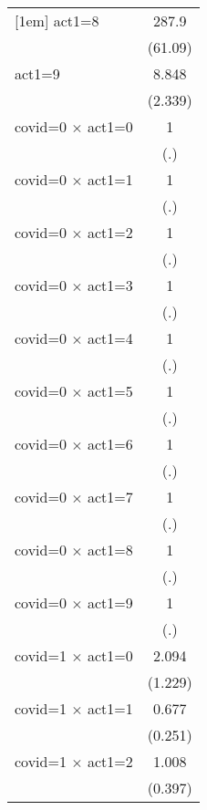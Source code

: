 {\begin{tabular}{l*{1}{c}}
[1em]
act1=8              &       287.9\sym{***}\\
                    &     (61.09)         \\
[1em]
act1=9              &       8.848\sym{***}\\
                    &     (2.339)         \\
[1em]
covid=0 $\times$ act1=0&           1         \\
                    &         (.)         \\
[1em]
covid=0 $\times$ act1=1&           1         \\
                    &         (.)         \\
[1em]
covid=0 $\times$ act1=2&           1         \\
                    &         (.)         \\
[1em]
covid=0 $\times$ act1=3&           1         \\
                    &         (.)         \\
[1em]
covid=0 $\times$ act1=4&           1         \\
                    &         (.)         \\
[1em]
covid=0 $\times$ act1=5&           1         \\
                    &         (.)         \\
[1em]
covid=0 $\times$ act1=6&           1         \\
                    &         (.)         \\
[1em]
covid=0 $\times$ act1=7&           1         \\
                    &         (.)         \\
[1em]
covid=0 $\times$ act1=8&           1         \\
                    &         (.)         \\
[1em]
covid=0 $\times$ act1=9&           1         \\
                    &         (.)         \\
[1em]
covid=1 $\times$ act1=0&       2.094         \\
                    &     (1.229)         \\
[1em]
covid=1 $\times$ act1=1&       0.677         \\
                    &     (0.251)         \\
[1em]
covid=1 $\times$ act1=2&       1.008         \\
                    &     (0.397)         \\

\end{tabular}}
